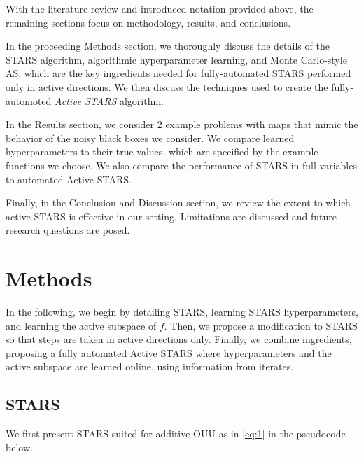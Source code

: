 \documentclass{amsart}
\begin{document}
\vspace{1cm}

With the literature review and introduced notation provided above, the remaining sections focus on methodology, results, and conclusions. 

In the proceeding Methods section, we thoroughly discuss the details of the STARS algorithm, algorithmic hyperparameter learning, and Monte Carlo-style AS, which are the key ingredients needed for fully-automated STARS performed only in active directions. We then discuss the techniques used to create the fully-automoted \textit{Active STARS} algorithm.

In the Results section, we consider 2 example problems with maps that mimic the behavior of the noisy black boxes we consider. We compare learned hyperparameters to their true values, which are specified by the example functions we choose. We also compare the performance of STARS in full variables to automated Active STARS.

Finally, in the Conclusion and Discussion section, we review the extent to which active STARS is effective in our setting. Limitations are discussed and future research questions are posed. 

\section{Methods}

In the following, we begin by detailing STARS, learning STARS hyperparameters, and learning the active subspace of $f$. Then, we propose a modification to STARS so that steps are taken in active directions only. Finally, we combine ingredients, proposing a fully automated Active STARS where hyperparameters and the active subspace are learned online, using information from iterates.


\subsection{STARS}

We first present STARS suited for additive OUU as in \eqref{eq:1} in the  pseudocode below.

\vspace{.25cm}
\end{document}
